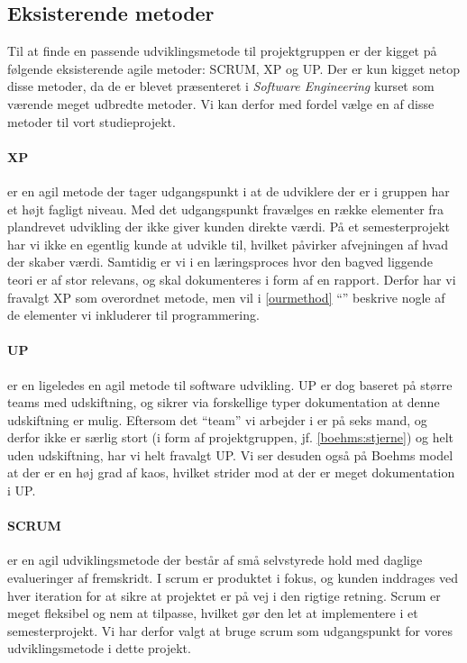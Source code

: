 \subsection{Eksisterende metoder}\label{existing}
Til at finde en passende udviklingsmetode til projektgruppen er der kigget på følgende eksisterende agile metoder: SCRUM, XP og UP.\cite{larman}
Der er kun kigget netop disse metoder, da de er blevet præsenteret i \emph{Software Engineering} kurset som værende meget udbredte metoder.
Vi kan derfor med fordel vælge en af disse metoder til vort studieprojekt.


\paragraph{XP} er en agil metode der tager udgangspunkt i at de udviklere der er i gruppen har et højt fagligt niveau.
Med det udgangspunkt fravælges en række elementer fra plandrevet udvikling der ikke giver kunden direkte værdi.
På et semesterprojekt har vi ikke en egentlig kunde at udvikle til, hvilket påvirker afvejningen af hvad der skaber værdi.
Samtidig er vi i en læringsproces hvor den bagved liggende teori er af stor relevans, og skal dokumenteres i form af en rapport.
Derfor har vi fravalgt XP som overordnet metode, men vil i \cref{ourmethod} ``'' beskrive nogle af de elementer vi inkluderer til programmering.

\paragraph{UP} er en ligeledes en agil metode til software udvikling.
UP er dog baseret på større teams med udskiftning, og sikrer via forskellige typer dokumentation at denne udskiftning er mulig.
Eftersom det ``team'' vi arbejder i er på seks mand, og derfor ikke er særlig stort (i form af projektgruppen, jf. \cref{boehms:stjerne}) og helt uden udskiftning, har vi helt fravalgt UP.
Vi ser desuden også på Boehms model at der er en høj grad af kaos, hvilket strider mod at der er meget dokumentation i UP.

\paragraph{SCRUM} er en agil udviklingsmetode der består af små selvstyrede hold med daglige evalueringer af fremskridt. 
I scrum er produktet i fokus, og kunden inddrages ved hver iteration for at sikre at projektet er på vej i den rigtige retning. Scrum er meget fleksibel og nem at tilpasse, hvilket gør den let at implementere i et semesterprojekt. 
Vi har derfor valgt at bruge scrum som udgangspunkt for vores udviklingsmetode i dette projekt.
